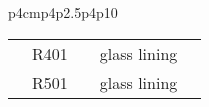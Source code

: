 \begin{landscape}
\begin{small}
\begin{longtable}{p{4cm}p{}p{}p{}p10}
\begin{tabular}{c|c|c|c|c}
                                                                                                 & R401                                                                                                  &                                                                                                      & glass lining                                                                                 &                                                                                                                                                                                                                                                                                                                                                                                                                                                                                                                                                                                                                                                                                                                                                                                                                                                                                                                           \\
                                                                                                 & R501                                                                                                  &                                                                                                      & glass lining                                                                                 &                                                                                                                                                                                                                                                                                                                                                                                                                                                                                                                                                                                                                                                                                                                                                                                                                                                                                                                           \\

\end{tabular}
\end{longtable}
\end{small}
\end{landscape}
